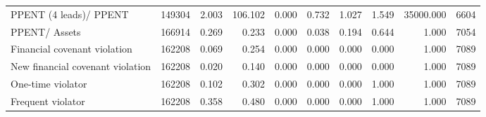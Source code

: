 \begin{table}[ht]
{\begin{tabular}{lrrrrrrrrr}
  PPENT (4 leads)/ PPENT & 149304 & 2.003 & 106.102 & 0.000 & 0.732 & 1.027 & 1.549 & 35000.000 & 6604 \\ 
  PPENT/ Assets & 166914 & 0.269 & 0.233 & 0.000 & 0.038 & 0.194 & 0.644 & 1.000 & 7054 \\ 
  Financial covenant violation & 162208 & 0.069 & 0.254 & 0.000 & 0.000 & 0.000 & 0.000 & 1.000 & 7089 \\ 
  New financial covenant violation & 162208 & 0.020 & 0.140 & 0.000 & 0.000 & 0.000 & 0.000 & 1.000 & 7089 \\ 
  One-time violator & 162208 & 0.102 & 0.302 & 0.000 & 0.000 & 0.000 & 1.000 & 1.000 & 7089 \\ 
  Frequent violator & 162208 & 0.358 & 0.480 & 0.000 & 0.000 & 0.000 & 1.000 & 1.000 & 7089 \\ 
   \hline
\end{tabular}}
\end{table}
